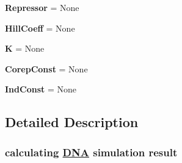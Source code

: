 \begin{DoxyCompactItemize}
\item 
\hypertarget{classweb_1_1_simulate___class_1_1_d_n_a___simulate_a6fc6961ca56a8c2f63f6289001092aa8}{{\bfseries Repressor} = None}\label{classweb_1_1_simulate___class_1_1_d_n_a___simulate_a6fc6961ca56a8c2f63f6289001092aa8}

\item 
\hypertarget{classweb_1_1_simulate___class_1_1_d_n_a___simulate_afe473f23d1ec1f5e576297bfa99b8d55}{{\bfseries Hill\-Coeff} = None}\label{classweb_1_1_simulate___class_1_1_d_n_a___simulate_afe473f23d1ec1f5e576297bfa99b8d55}

\item 
\hypertarget{classweb_1_1_simulate___class_1_1_d_n_a___simulate_ab41cef07d4729f53b81042b06b637fdf}{{\bfseries K} = None}\label{classweb_1_1_simulate___class_1_1_d_n_a___simulate_ab41cef07d4729f53b81042b06b637fdf}

\item 
\hypertarget{classweb_1_1_simulate___class_1_1_d_n_a___simulate_a4c01a78dc773cffe777a928a3ad8abcf}{{\bfseries Corep\-Const} = None}\label{classweb_1_1_simulate___class_1_1_d_n_a___simulate_a4c01a78dc773cffe777a928a3ad8abcf}

\item 
\hypertarget{classweb_1_1_simulate___class_1_1_d_n_a___simulate_a555c52a90c570dda2ccd7a0ec7eb00e2}{{\bfseries Ind\-Const} = None}\label{classweb_1_1_simulate___class_1_1_d_n_a___simulate_a555c52a90c570dda2ccd7a0ec7eb00e2}

\end{DoxyCompactItemize}


\subsection{Detailed Description}
\subsubsection*{calculating \hyperlink{class_d_n_a}{D\-N\-A} simulation result }

